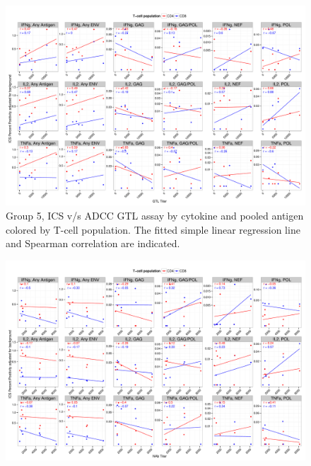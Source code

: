 \documentclass[11pt]{article}\usepackage[]{graphicx}\usepackage[]{color}
\makeatletter
\def\maxwidth{ %
  \ifdim\Gin@nat@width>\linewidth
    \linewidth
  \else
    \Gin@nat@width
  \fi
}
\newenvironment{knitrout}{}{} %
\makeatother
\begin{document}
\begin{landscape}
\begin{figure}[H]
\begin{center}
\begin{knitrout}
\color{fgcolor}
\includegraphics[width=\maxwidth]{figure/corrplot_Grp5_ADCC_pooledAntigen-1} 

\end{knitrout}
\caption{Group 5, ICS v/s ADCC GTL assay by cytokine and pooled antigen colored by T-cell population. The fitted simple linear regression line and Spearman correlation are indicated.}
\end{center}
\end{figure}


\begin{figure}[H]
\begin{center}
\begin{knitrout}
\color{fgcolor}
\includegraphics[width=\maxwidth]{figure/corrplot_Grp5_NAb_pooledAntigen-1} 


\end{knitrout}
\end{center}
\end{figure}
\end{landscape}
\end{document}
